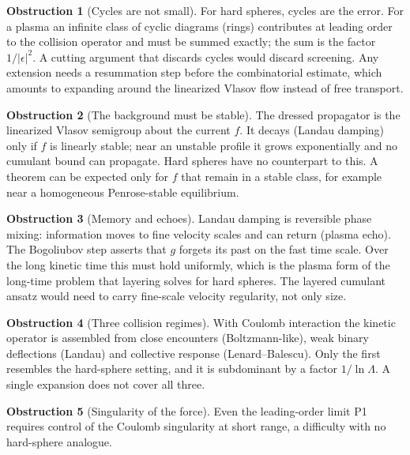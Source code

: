 \documentclass[11pt]{article}
\newcommand{\diel}{\epsilon}
\theoremstyle{definition}
\newtheorem{obstruction}{Obstruction}
\begin{document}
\begin{obstruction}[Cycles are not small]
For hard spheres, cycles are the error. For a plasma an infinite class of
cyclic diagrams (rings) contributes at leading order to the collision
operator and must be summed exactly; the sum is the factor $1/|\diel|^2$. A
cutting argument that discards cycles would discard screening. Any extension
needs a resummation step before the combinatorial estimate, which amounts to
expanding around the linearized Vlasov flow instead of free transport.
\end{obstruction}

\begin{obstruction}[The background must be stable]
The dressed propagator is the linearized Vlasov semigroup about the current
$f$. It decays (Landau damping) only if $f$ is linearly stable; near an
unstable profile it grows exponentially and no cumulant bound can propagate.
Hard spheres have no counterpart to this. A theorem can be expected only for
$f$ that remain in a stable class, for example near a homogeneous
Penrose-stable equilibrium.
\end{obstruction}

\begin{obstruction}[Memory and echoes]
Landau damping is reversible phase mixing: information moves to fine
velocity scales and can return (plasma echo). The Bogoliubov step asserts
that $g$ forgets its past on the fast time scale. Over the long kinetic time
this must hold uniformly, which is the plasma form of the long-time problem
that layering solves for hard spheres. The layered cumulant ansatz would
need to carry fine-scale velocity regularity, not only size.
\end{obstruction}

\begin{obstruction}[Three collision regimes]
With Coulomb interaction the kinetic operator is assembled from close
encounters (Boltzmann-like), weak binary deflections (Landau) and collective
response (Lenard--Balescu). Only the first resembles the hard-sphere setting,
and it is subdominant by a factor $1/\ln\Lambda$. A single expansion does not
cover all three.
\end{obstruction}

\begin{obstruction}[Singularity of the force]
Even the leading-order limit P1 requires control of the Coulomb singularity
at short range, a difficulty with no hard-sphere analogue.
\end{obstruction}
\end{document}
